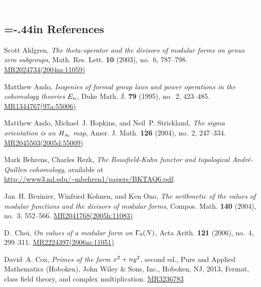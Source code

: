 \documentclass{gtpart}
\theoremstyle{definition}
\theoremstyle{remark}
\renewcommand{\=}{\approx}
\renewcommand{\-}{\sim}
\newcommand{\wt}[1]{\textcolor{white}{#1} \!~}
\numberwithin{equation}{section}
\begin{document}
\renewcommand\refname{}
\newcommand{\AX}[1]{\href{http://arxiv.org/abs/#1}{arXiv:#1}}
\newcommand{\MRn}[2]{\href{http://www.ams.org/mathscinet-getitem?mr=#1}{MR#1#2}}
\newcommand{\name}{TateNormalLevelResolutions.pdf}
\wt{.}\vspace{-.5in}
\begin{thebibliography}

\section*{\leftskip=-.44in References \vspace{.17in}}

Scott Ahlgren, \emph{The theta-operator and the divisors of modular forms on
  genus zero subgroups}, Math. Res. Lett. \textbf{10} (2003), no.~6,
  787--798. \MRn{2024734}{(2004m:11059)}

Matthew Ando, \emph{Isogenies of formal group laws and power operations in the
  cohomology theories {$E\sb n$}}, Duke Math. J. \textbf{79} (1995), no.~2,
  423--485. \MRn{1344767}{(97a:55006)}

Matthew Ando, Michael~J. Hopkins, and Neil~P. Strickland, \emph{The sigma
  orientation is an {$H\sb \infty$} map}, Amer. J. Math. \textbf{126} (2004),
  no.~2, 247--334. \MRn{2045503}{(2005d:55009)}

Mark Behrens, Charles Rezk, \emph{The Bousfield-Kuhn functor and topological 
  Andr\'e-Quillen cohomology}, available at \\
  \href{http://www3.nd.edu/~mbehren1/papers/BKTAQ6.pdf}
  {http://www3.nd.edu/\textasciitilde mbehren1/papers/BKTAQ6.pdf}.

Jan~H. Bruinier, Winfried Kohnen, and Ken Ono, \emph{The arithmetic of the
  values of modular functions and the divisors of modular forms}, Compos. Math.
  \textbf{140} (2004), no.~3, 552--566. \MRn{2041768}{(2005h:11083)}

D.~Choi, \emph{On values of a modular form on {$\Gamma\sb 0(N)$}}, Acta Arith.
  \textbf{121} (2006), no.~4, 299--311. \MRn{2224397}{(2006m:11051)}

David~A. Cox, \emph{Primes of the form {$x\sp 2 + ny\sp 2$}}, second ed., Pure
  and Applied Mathematics (Hoboken), John Wiley \& Sons, Inc., Hoboken, NJ,
  2013, Fermat, class field theory, and complex multiplication. \MRn{3236783}{}


\end{thebibliography}
\end{document}
